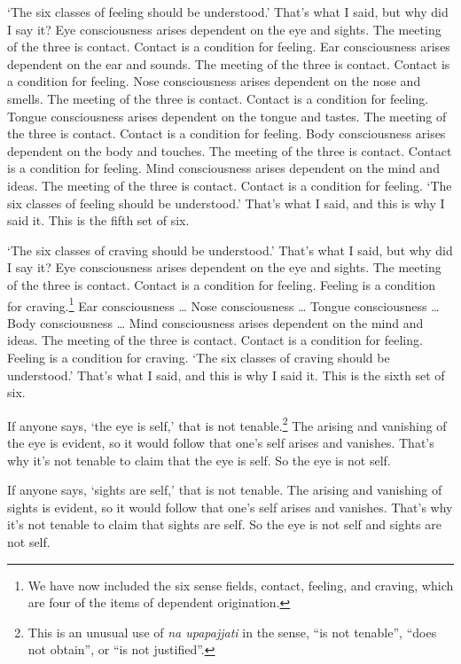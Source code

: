 \documentclass[12pt,openany]{book}%
\begin{document}
‘The six classes of feeling should be understood.’ That’s what I said, but why did I say it? Eye consciousness arises dependent on the eye and sights. The meeting of the three is contact. Contact is a condition for feeling. Ear consciousness arises dependent on the ear and sounds. The meeting of the three is contact. Contact is a condition for feeling. Nose consciousness arises dependent on the nose and smells. The meeting of the three is contact. Contact is a condition for feeling. Tongue consciousness arises dependent on the tongue and tastes. The meeting of the three is contact. Contact is a condition for feeling. Body consciousness arises dependent on the body and touches. The meeting of the three is contact. Contact is a condition for feeling. Mind consciousness arises dependent on the mind and ideas. The meeting of the three is contact. Contact is a condition for feeling. ‘The six classes of feeling should be understood.’ That’s what I said, and this is why I said it. This is the fifth set of six. 

‘The six classes of craving should be understood.’ That’s what I said, but why did I say it? Eye consciousness arises dependent on the eye and sights. The meeting of the three is contact. Contact is a condition for feeling. Feeling is a condition for craving.\footnote{We have now included the six sense fields, contact, feeling, and craving, which are four of the items of dependent origination. } Ear consciousness … Nose consciousness … Tongue consciousness … Body consciousness … Mind consciousness arises dependent on the mind and ideas. The meeting of the three is contact. Contact is a condition for feeling. Feeling is a condition for craving. ‘The six classes of craving should be understood.’ That’s what I said, and this is why I said it. This is the sixth set of six. 

If anyone says, ‘the eye is self,’ that is not tenable.\footnote{This is an unusual use of \textit{na upapajjati} in the sense, “is not tenable”, “does not obtain”, or “is not justified”. } The arising and vanishing of the eye is evident, so it would follow that one’s self arises and vanishes. That’s why it’s not tenable to claim that the eye is self. So the eye is not self. 

If anyone says, ‘sights are self,’ that is not tenable. The arising and vanishing of sights is evident, so it would follow that one’s self arises and vanishes. That’s why it’s not tenable to claim that sights are self. So the eye is not self and sights are not self. 
\end{document}
